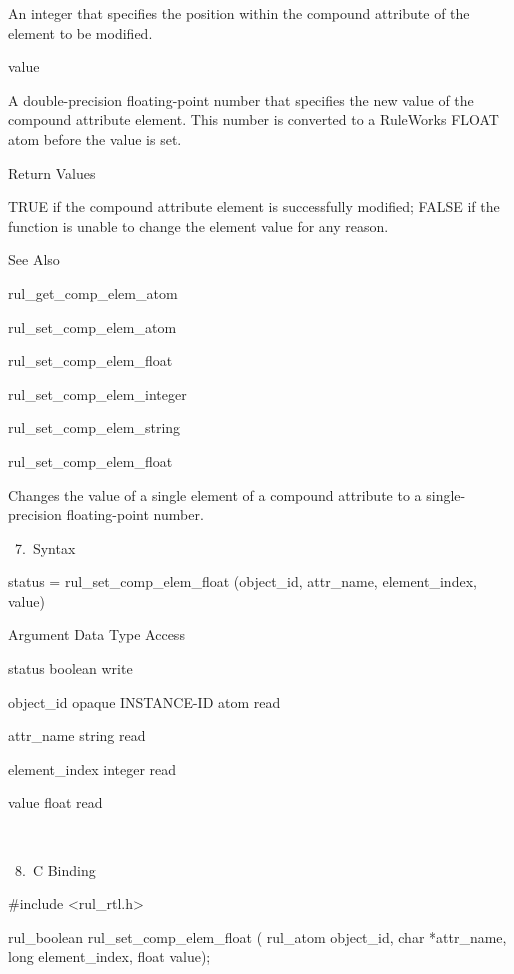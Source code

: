 {          An integer that specifies the
          position within the compound
          attribute of the element to be
          modified.

          value

          A double-precision floating-point
          number that specifies the new value
          of the compound attribute element.
          This number is converted to a
          RuleWorks FLOAT atom before the
          value is set.

          Return Values

          TRUE if the compound attribute
          element is successfully modified;
          FALSE if the function is unable to
          change the element value for any
          reason.

          See Also

          rul_get_comp_elem_atom

          rul_set_comp_elem_atom

          rul_set_comp_elem_float

          rul_set_comp_elem_integer

          rul_set_comp_elem_string

          rul_set_comp_elem_float

          Changes the value of a single
          element of a compound attribute to a
          single-precision floating-point
          number.

       7. Syntax

          status = rul_set_comp_elem_float
          (object_id, attr_name,
          element_index, value)

          Argument  Data Type     Access

          status  boolean     write

          object_id  opaque INSTANCE-ID atom
           read

          attr_name  string     read

          element_index  integer     read

          value  float     read

           

       8. C Binding

          #include <rul_rtl.h>

          rul_boolean rul_set_comp_elem_float
          (
          rul_atom object_id,
          char  *attr_name,
          long   element_index,
          float  value);

}
